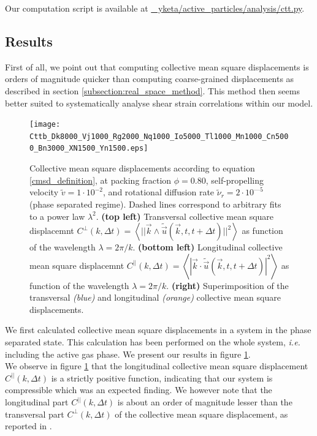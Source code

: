 \documentclass[class=report, float=false, crop=false]{standalone}
\begin{document}
Our computation script is available at \href{https://github.com/yketa/active_particles/blob/master/analysis/ctt.py}{{\faGithub~ yketa/active\_particles/analysis/ctt.py}}.

\subsection{Results}


First of all, we point out that computing collective mean square displacements is orders of magnitude quicker than computing coarse-grained displacements as described in section \ref{subsection:real_space_method}. This method then seems better suited to systematically analyse shear strain correlations within our model.

\begin{figure}[H]
\centering
\texttt{[image: Cttb\_Dk8000\_Vj1000\_Rg2000\_Nq1000\_Io5000\_Tl1000\_Mn1000\_Cn5000\_Bn3000\_XN1500\_Yn1500.eps]}
\vspace{-1cm}
\caption{Collective mean square displacements according to equation \ref{cmsd_definition}, at packing fraction $\phi = 0.80$, self-propelling velocity $\tilde{v} = 1\cdot10^{-2}$, and rotational diffusion rate $\tilde{\nu}_r = 2\cdot10^{—5}$ (phase separated regime). Dashed lines correspond to arbitrary fits to a power law $\lambda^2$. \textbf{(top left)} Transversal collective mean square displacemnt $C^{\perp}(k, \Delta t) = \left<||\vec{k}\wedge\tilde{\vec{u}}(\vec{k}, t, t + \Delta t)||^2\right>$ as function of the wavelength $\lambda = 2\pi/k$. \textbf{(bottom left)} Longitudinal collective mean square displacemnt $C^{||}(k, \Delta t) = \left<|\vec{k}\cdot\tilde{\vec{u}}(\vec{k}, t, t + \Delta t)|^2\right>$ as function of the wavelength $\lambda = 2\pi/k$. \textbf{(right)} Superimposition of the transversal \textit{(blue)} and longitudinal \textit{(orange)} collective mean square displacements.}
\label{preliminary_cmsd}
\end{figure}

We first calculated collective mean square displacements in a system in the phase separated state. This calculation has been performed on the whole system, \textit{i.e.} including the active gas phase. We present our results in figure \ref{preliminary_cmsd}.\\

We observe in figure \ref{preliminary_cmsd} that the longitudinal collective mean square displacement $C^{||}(k, \Delta t)$ is a strictly positive function, indicating that our system is compressible \cite{illing2016strain} which was an expected finding. We however note that the longitudinal part $C^{||}(k, \Delta t)$ is about an order of magnitude lesser than the transversal part $C^{\perp}(k, \Delta t)$ of the collective mean square displacement, as reported in \cite{leonforte2005continuum}.\\
\end{document}
